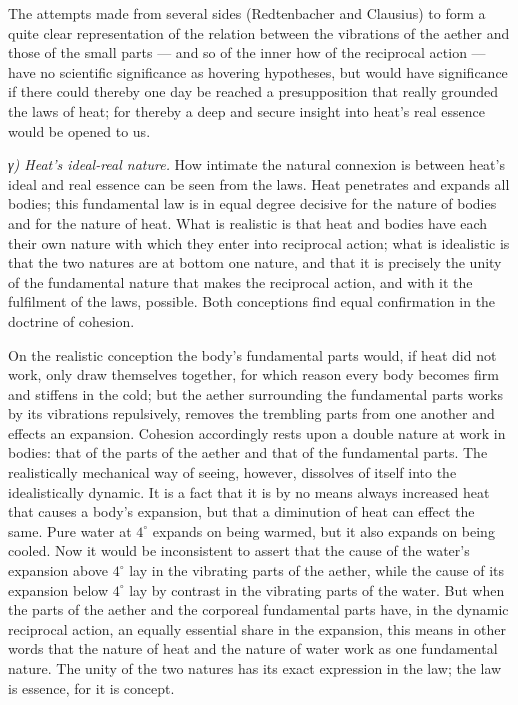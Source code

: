 \documentclass[12pt,a4paper]{book}
\newcommand{\subrunin}[1]{\emph{#1}\hspace{0.4em}}
\begin{document}
The attempts made from several sides (Redtenbacher and Clausius) to form a quite clear representation of the relation
between the vibrations of the aether and those of the small parts --- and so of the inner how of the reciprocal action
--- have no scientific significance as hovering hypotheses, but would have significance if there could thereby one day be
reached a presupposition that really grounded the laws of heat; for thereby a deep and secure insight into heat's real
essence would be opened to us.

\subrunin{γ) Heat's ideal-real nature.} How intimate the natural connexion is between heat's ideal and real essence can
be seen from the laws. Heat penetrates and expands all bodies; this fundamental law is in equal degree decisive for the
nature of bodies and for the nature of heat. What is realistic is that heat and bodies have each their own nature with
which they enter into reciprocal action; what is idealistic is that the two natures are at bottom one nature, and that it
is precisely the unity of the fundamental nature that makes the reciprocal action, and with it
the fulfilment of the laws, possible. Both conceptions find equal confirmation in the doctrine of cohesion.

On the realistic conception the body's fundamental parts would, if heat did not work, only draw themselves together, for
which reason every body becomes firm and stiffens in the cold; but the aether surrounding the fundamental parts works by
its vibrations repulsively, removes the trembling parts from one another and effects an expansion. Cohesion accordingly
rests upon a double nature at work in bodies: that of the parts of the aether and that of the fundamental parts. The
realistically mechanical way of seeing, however, dissolves of itself into the idealistically dynamic. It is a fact that
it is by no means always increased heat that causes a body's expansion, but that a diminution of heat can effect the
same. Pure water at $4^{\circ}$ expands on being warmed, but it also expands on being cooled. Now it would be
inconsistent to assert that the cause of the water's expansion above $4^{\circ}$ lay in the vibrating parts of the
aether, while the cause of its expansion below $4^{\circ}$ lay by contrast in the vibrating parts of the water. But when
the parts of the aether and the corporeal fundamental parts have, in the dynamic reciprocal action, an equally essential
share in the expansion, this means in other words that the nature of heat and the nature of water work as one fundamental
nature. The unity of the two natures has its exact expression in the law; the law is essence, for it is concept.
\end{document}
